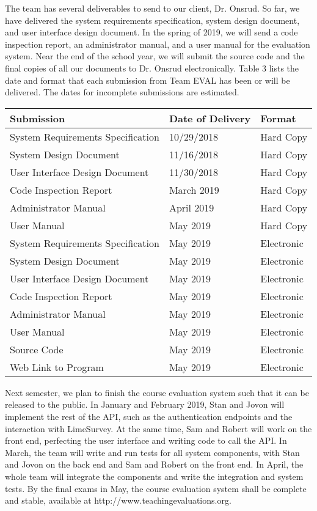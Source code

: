 \documentclass{article}
\begin{document}
The team has several deliverables to send to our client, Dr. Onsrud. So far, we have delivered the system requirements specification, system design document, and user interface design document. In the spring of 2019, we will send a code inspection report, an administrator manual, and a user manual for the evaluation system. Near the end of the school year, we will submit the source code and the final copies of all our documents to Dr. Onsrud electronically. Table 3 lists the date and format that each submission from Team EVAL has been or will be delivered. The dates for incomplete submissions are estimated.
\newpage

\begin{center}
\begin{tabular}{|p{6cm}|p{3cm}|p{3cm}|} 
\hline
\textbf{Submission} & \textbf{Date of Delivery} & \textbf{Format} \\
\hline
System Requirements Specification & 10/29/2018 & Hard Copy\\ 
\hline
System Design Document & 11/16/2018 & Hard Copy\\ 
\hline
User Interface Design Document & 11/30/2018 & Hard Copy\\ 
\hline
Code Inspection Report & March 2019 & Hard Copy\\ 
\hline
Administrator Manual & April 2019 & Hard Copy\\ 
\hline
User Manual & May 2019 & Hard Copy\\ 
\hline
System Requirements Specification & May 2019 & Electronic\\ 
\hline
System Design Document & May 2019 & Electronic\\ 
\hline
User Interface Design Document & May 2019 & Electronic\\ 
\hline
Code Inspection Report & May 2019 & Electronic\\ 
\hline
Administrator Manual & May 2019 & Electronic\\ 
\hline
User Manual & May 2019 & Electronic\\ 
\hline
Source Code & May 2019 & Electronic\\ 
\hline
Web Link to Program & May 2019 & Electronic\\ 
\hline
\end{tabular}
\end{center}

Next semester, we plan to finish the course evaluation system such that it can be released to the public. In January and February 2019, Stan and Jovon will implement the rest of the API, such as the authentication endpoints and the interaction with LimeSurvey. At the same time, Sam and Robert will work on the front end, perfecting the user interface and writing code to call the API. In March, the team will write and run tests for all system components, with Stan and Jovon on the back end and Sam and Robert on the front end. In April, the whole team will integrate the components and write the integration and system tests. By the final exams in May, the course evaluation system shall be complete and stable, available at http://www.teachingevaluations.org.
\end{document}
